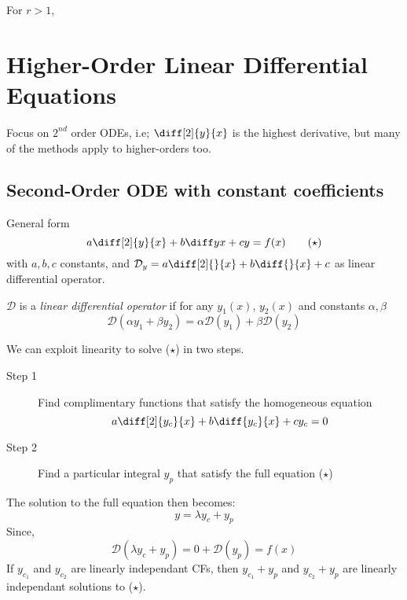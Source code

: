 \documentclass{article}
\begin{document}
\begin{eg}
    For $r > 1$,
    \begin{center}
    \end{center}
\end{eg}

\section{Higher-Order Linear Differential Equations}
Focus on $2^{nd}$ order ODEs, i.e; $\diff[2]{y}{{x}}$ is the highest derivative,
but many of the methods apply to higher-orders too.

\subsection{Second-Order ODE with constant coefficients}
General form
\[
    a \diff[2]{y}{x} + b \diff yx + cy = f(x) \tag{$\star$}
\]
with $a, b, c$ constants, and $\mathcal{D}_y = a \diff[2]{}{x} + b \diff {}{x} + c$ as linear differential operator.

\begin{defi}
    $\mathcal{D}$ is a \emph{linear differential operator} if for any $y_1(x)$, $y_2(x)$ and constants $\alpha, \beta$
    \[
        \mathcal{D}(\alpha y_1 + \beta y_2) = \alpha \mathcal{D} (y_1) + \beta \mathcal{D} (y_2)
    \]
\end{defi}
We can exploit linearity to solve ($\star$) in two steps.
\begin{description}
    \item[Step 1] Find complimentary functions that satisfy the homogeneous equation
    \[
        a \diff[2]{y_c}{x} + b \diff {y_c}{x} + cy_c = 0
    \]
    \item[Step 2] Find a particular integral $y_p$ that satisfy the full equation ($\star$)
\end{description}
The solution to the full equation then becomes:
\[
    y = \lambda y_c + y_p
\]
Since,
\[
\mathcal{D}(\lambda y_c + y_p) = 0 +  \mathcal{D}(y_p) = f(x)   
\]
If $y_{c_1}$ and $y_{c_2}$ are linearly independant CFs, then $y_{c_1} + y_p$ and $y_{c_2} + y_p$ are linearly independant solutions to ($\star$).
\end{document}
